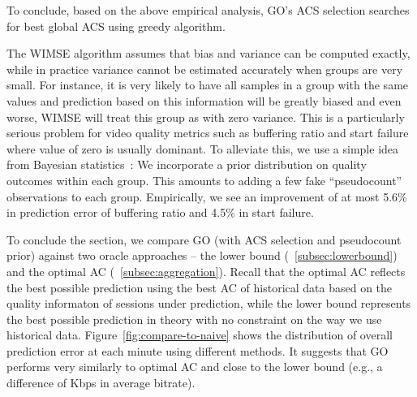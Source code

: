To conclude, based on the above empirical analysis, GO's ACS selection searches for best global ACS using greedy algorithm. 


The WIMSE algorithm assumes that bias and variance can be computed exactly, while in practice variance cannot be estimated accurately when groups are very small. For instance, it is very likely to have all samples in a group with the same values and prediction based on this information will be greatly biased and even worse, WIMSE will treat this group as with zero variance. This is a particularly serious problem for video quality metrics such as buffering ratio and start failure where value of zero is usually dominant.
To alleviate this, we use a simple idea from Bayesian statistics~\cite{}: We incorporate a prior distribution on quality outcomes within each group.  This amounts to adding a few fake ``pseudocount'' observations to each group.  Empirically, we see an improvement of at most 5.6\% in prediction error of buffering ratio and 4.5\% in start failure.




To conclude the section, we compare GO (with ACS selection and pseudocount prior) against two oracle approaches -- the lower bound (\Section~\ref{subsec:lowerbound}) and the optimal AC (\Section~\ref{subsec:aggregation}).  Recall that the optimal AC reflects the best possible prediction using the best AC of historical data based on the quality informaton of sessions under prediction, while the lower bound represents the best possible prediction in theory with no constraint on the way we use historical data. Figure~\ref{fig:compare-to-naive} shows the distribution of overall prediction error at each minute using different methods. It suggests that GO performs very similarly to optimal AC and close to the lower bound (e.g., a difference of \fillme Kbps in average bitrate). 

